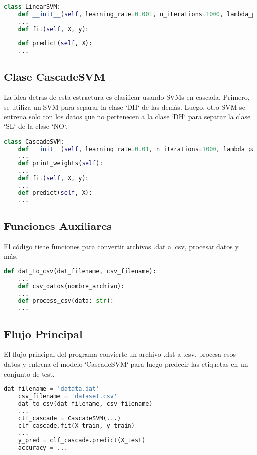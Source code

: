 \documentclass[12pt]{article}
\begin{document}
\begin{lstlisting}[language=Python]
	class LinearSVM:
	def __init__(self, learning_rate=0.001, n_iterations=1000, lambda_param=0.1):
	...
	def fit(self, X, y):
	...
	def predict(self, X):
	...
\end{lstlisting}

\subsection*{Clase CascadeSVM}
La idea detrás de esta estructura es clasificar usando SVMs en cascada. Primero, se utiliza un SVM para separar la clase `DH` de las demás. Luego, otro SVM se entrena solo con los datos que no pertenecen a la clase `DH` para separar la clase `SL` de la clase `NO`.

\begin{lstlisting}[language=Python]
	class CascadeSVM:
	def __init__(self, learning_rate=0.01, n_iterations=1000, lambda_param=0.1):
	...
	def print_weights(self):
	...
	def fit(self, X, y):
	...
	def predict(self, X):
	...
\end{lstlisting}

\subsection*{Funciones Auxiliares}
El código tiene funciones para convertir archivos .dat a .csv, procesar datos y más.

\begin{lstlisting}[language=Python]
	def dat_to_csv(dat_filename, csv_filename):
	...
	def csv_datos(nombre_archivo):
	...
	def process_csv(data: str):
	...
\end{lstlisting}

\subsection*{Flujo Principal}
El flujo principal del programa convierte un archivo .dat a .csv, procesa esos datos y entrena el modelo `CascadeSVM` para luego predecir las etiquetas en un conjunto de test.

\begin{lstlisting}[language=Python]
	dat_filename = 'datata.dat'
	csv_filename = 'dataset.csv'
	dat_to_csv(dat_filename, csv_filename)
	...
	clf_cascade = CascadeSVM(...)
	clf_cascade.fit(X_train, y_train)
	...
	y_pred = clf_cascade.predict(X_test)
	accuracy = ...
\end{lstlisting}
\end{document}
